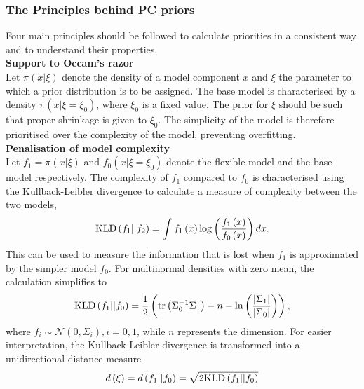 \documentclass[12pt]{book}
\begin{document}
\subsubsection{The Principles behind PC priors}
Four main principles should be followed to calculate priorities in a consistent way and to understand their properties. \vspace{6pt}\\
\textbf{Support to Occam's razor} \vspace{6pt}\\
Let $\pi\left(x|\xi\right)$ denote the density of a model component $x$ and $\xi$ the parameter to which a prior distribution is to be assigned. The base model is characterised by a density $\pi\left(x|\xi=\xi_0\right)$, where $\xi_0$ is a fixed value. The prior for $\xi$ should be such that proper shrinkage is given to $\xi_0$. The simplicity of the model is therefore prioritised over the complexity of the model, preventing overfitting.
\vspace{6pt}\\
\textbf{Penalisation of model complexity} \vspace{6pt}\\
Let $f_1=\pi\left(x|\xi\right)$ and $f_0\left(x|\xi=\xi_0\right)$ denote the flexible model and the base model respectively. The complexity of $f_1$ compared to $f_0$ is characterised using the Kullback-Leibler divergence to calculate a measure of complexity between the two models,
\begin{equation}
    \hbox{KLD}\left(f_1||f_2\right) = \int f_1\left(x\right)\log\left(\frac{f_1\left(x\right)}{f_0\left(x\right)}\right)dx.
\end{equation}
This can be used to measure the information that is lost when $f_1$ is approximated by the simpler model $f_0$. For multinormal densities with zero mean, the calculation simplifies to
\begin{equation}
    \hbox{KLD}\left(f_1||f_0\right) = \frac{1}{2}\left(\hbox{tr}\left(\Sigma_0^{-1}\Sigma_1\right)-n-\ln\left(\frac{\left|\Sigma_1\right|}{\left|\Sigma_0\right|}\right)\right),
\end{equation}
where $f_i\sim\mathcal{N}\left(0,\Sigma_i\right), i=0,1$, while $n$ represents the dimension. For easier interpretation, the Kullback-Leibler divergence is transformed into a unidirectional distance measure
\begin{equation}
    d\left(\xi\right) = d\left(f_1||f_0\right)=\sqrt{2\hbox{KLD}\left(f_1||f_0\right)}
\end{equation}
\end{document}
